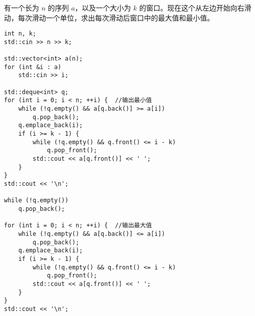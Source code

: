 有一个长为 $n$ 的序列 $a$，以及一个大小为 $k$ 的窗口。现在这个从左边开始向右滑动，每次滑动一个单位，求出每次滑动后窗口中的最大值和最小值。
\begin{lstlisting}
int n, k;
std::cin >> n >> k;

std::vector<int> a(n);
for (int &i : a)
	std::cin >> i;

std::deque<int> q;
for (int i = 0; i < n; ++i) {  //输出最小值
	while (!q.empty() && a[q.back()] >= a[i]) 
		q.pop_back();
	q.emplace_back(i);
	if (i >= k - 1) {
		while (!q.empty() && q.front() <= i - k) 
			q.pop_front();
		std::cout << a[q.front()] << ' ';
	}
}
std::cout << '\n';

while (!q.empty()) 
	q.pop_back();

for (int i = 0; i < n; ++i) {  //输出最大值
	while (!q.empty() && a[q.back()] <= a[i]) 
		q.pop_back();
	q.emplace_back(i);
	if (i >= k - 1) {
		while (!q.empty() && q.front() <= i - k) 
			q.pop_front();
		std::cout << a[q.front()] << ' ';
	}
}
std::cout << '\n';
\end{lstlisting}
